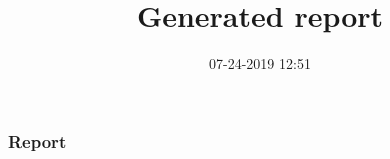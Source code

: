 \documentclass[slidestop]{beamer}
\numberwithin{equation}{section}
\begin{document}

\part{ }


\title[CIRL Generated Report]{Generated report}

\author{}

\institute{}

\date{07-24-2019 12:51}

\frame{\titlepage}

\section{Report}
\end{document}
